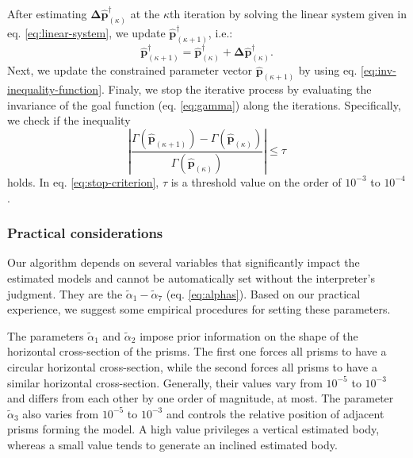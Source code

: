 After estimating $\boldsymbol{\Delta} \hat{\mathbf{p}}^{\dagger}_{(\kappa)}$ at the 
$\kappa$th iteration by solving the linear system given in eq. \ref{eq:linear-system}, we update $\hat{\mathbf{p}}^{\dagger}_{(\kappa + 1)}$, i.e.:
\begin{equation}\label{eq:p-k1-dagger}
\hat{\mathbf{p}}^{\dagger}_{(\kappa + 1)} =
\hat{\mathbf{p}}^{\dagger}_{(\kappa)} +
\boldsymbol{\Delta} \hat{\mathbf{p}}^{\dagger}_{(\kappa)}.
\end{equation}
Next, we update the constrained parameter vector  $\hat{\mathbf{p}}_{(\kappa + 1)}$ 
by using eq. \ref{eq:inv-inequality-function}.
Finaly, we stop the iterative process by evaluating the invariance of the 
goal function (eq. \ref{eq:gamma}) along the iterations.
Specifically, we check if the inequality
\begin{equation}\label{eq:stop-criterion}
 \left| \frac{\Gamma (\hat{\mathbf{p}}_{(\kappa +1)})  -  
 \Gamma (\hat{\mathbf{p}}_{(\kappa)})}
 {\Gamma (\hat{\mathbf{p}}_{(\kappa)})} 
 \right|  \le \tau
\end{equation}
holds.  In eq. \ref{eq:stop-criterion}, $\tau$ is a threshold value on the order of $10^{-3}$
to $10^{-4}$. 

\subsubsection{Practical considerations}

Our algorithm depends on several variables that significantly impact the estimated models 
and cannot be automatically set without the interpreter’s judgment. They are the 
$\tilde{\alpha}_1 - \tilde{\alpha}_7$ (eq. \ref{eq:alphas}). 
Based on our practical experience, we suggest some 
empirical procedures for setting these parameters.

The parameters $\tilde{\alpha}_1$ and $\tilde{\alpha}_2$ impose prior information on the 
shape of the horizontal cross-section of the prisms. 
The first one forces all prisms to have a circular horizontal cross-section, while 
the second forces all prisms to have a similar horizontal cross-section.
Generally, their values vary from $10^{-5}$ to $10^{-3}$ and differs from
each other by one order of magnitude, at most.
The parameter $\tilde{\alpha}_3$ also varies from $10^{-5}$ to $10^{-3}$ and 
controls the relative position of adjacent prisms forming the model.
A high value privileges a vertical estimated body, whereas a small value 
tends to generate an inclined estimated body.

